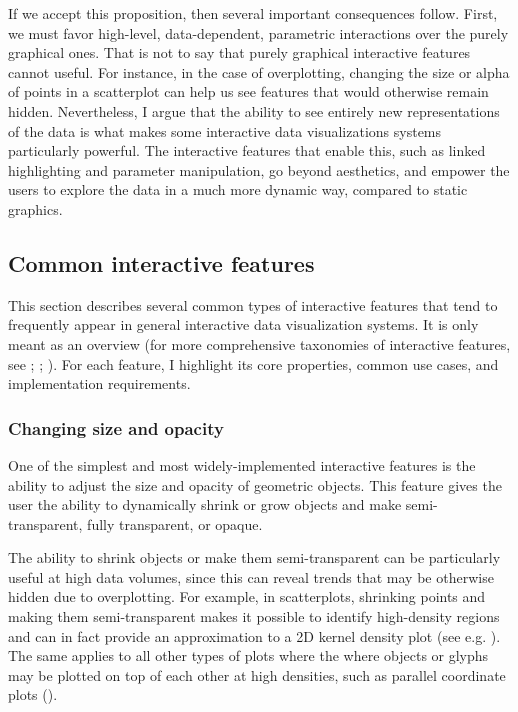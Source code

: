 \documentclass[
]{book}
\begin{document}
If we accept this proposition, then several important consequences follow. First, we must favor high-level, data-dependent, parametric interactions over the purely graphical ones. That is not to say that purely graphical interactive features cannot useful. For instance, in the case of overplotting, changing the size or alpha of points in a scatterplot can help us see features that would otherwise remain hidden. Nevertheless, I argue that the ability to see entirely new representations of the data is what makes some interactive data visualizations systems particularly powerful. The interactive features that enable this, such as linked highlighting and parameter manipulation, go beyond aesthetics, and empower the users to explore the data in a much more dynamic way, compared to static graphics.

\subsection{Common interactive features}\label{common-features}

This section describes several common types of interactive features that tend to frequently appear in general interactive data visualization systems. It is only meant as an overview (for more comprehensive taxonomies of interactive features, see ; ; ). For each feature, I highlight its core properties, common use cases, and implementation requirements.

\subsubsection{Changing size and opacity}\label{changing-size-and-opacity}

One of the simplest and most widely-implemented interactive features is the ability to adjust the size and opacity of geometric objects. This feature gives the user the ability to dynamically shrink or grow objects and make semi-transparent, fully transparent, or opaque.

The ability to shrink objects or make them semi-transparent can be particularly useful at high data volumes, since this can reveal trends that may be otherwise hidden due to overplotting. For example, in scatterplots, shrinking points and making them semi-transparent makes it possible to identify high-density regions and can in fact provide an approximation to a 2D kernel density plot (see e.g. ). The same applies to all other types of plots where the where objects or glyphs may be plotted on top of each other at high densities, such as parallel coordinate plots ().
\end{document}

